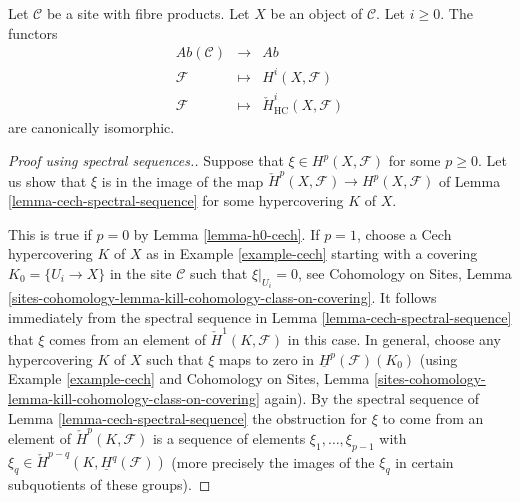 \begin{theorem}
\label{theorem-cohomology-hypercoverings}
Let $\mathcal{C}$ be a site with fibre products.
Let $X$ be an object of $\mathcal{C}$. Let $i \geq 0$.
The functors
\begin{eqnarray*}
\textit{Ab}(\mathcal{C}) & \longrightarrow & \textit{Ab} \\
\mathcal{F} & \longmapsto & H^i(X, \mathcal{F}) \\
\mathcal{F} & \longmapsto & \check{H}^i_{\text{HC}}(X, \mathcal{F})
\end{eqnarray*}
are canonically isomorphic.
\end{theorem}

\begin{proof}[Proof using spectral sequences.]
Suppose that $\xi \in H^p(X, \mathcal{F})$ for some $p \geq 0$.
Let us show that $\xi$ is in the image of the map
$\check{H}^p(X, \mathcal{F}) \to H^p(X, \mathcal{F})$ of
Lemma \ref{lemma-cech-spectral-sequence}
for some hypercovering $K$ of $X$.

\medskip\noindent
This is true if $p = 0$ by Lemma \ref{lemma-h0-cech}.
If $p = 1$, choose a Cech hypercovering $K$ of $X$ as in
Example \ref{example-cech} starting with a covering
$K_0 = \{U_i \to X\}$ in the site $\mathcal{C}$ such that
$\xi|_{U_i} = 0$, see
Cohomology on Sites,
Lemma \ref{sites-cohomology-lemma-kill-cohomology-class-on-covering}.
It follows immediately from the spectral sequence
in Lemma \ref{lemma-cech-spectral-sequence} that $\xi$ comes
from an element of $\check{H}^1(K, \mathcal{F})$ in this case.
In general, choose any hypercovering $K$ of $X$ such
that $\xi$ maps to zero in $\underline{H}^p(\mathcal{F})(K_0)$
(using Example \ref{example-cech} and
Cohomology on Sites,
Lemma \ref{sites-cohomology-lemma-kill-cohomology-class-on-covering}
again).
By the spectral sequence of Lemma \ref{lemma-cech-spectral-sequence}
the obstruction for $\xi$ to come from an element of
$\check{H}^p(K, \mathcal{F})$ is a sequence of elements
$\xi_1, \ldots, \xi_{p - 1}$ with
$\xi_q \in \check{H}^{p - q}(K, \underline{H}^q(\mathcal{F}))$
(more precisely the images of the $\xi_q$ in certain subquotients
of these groups).


\end{proof}
